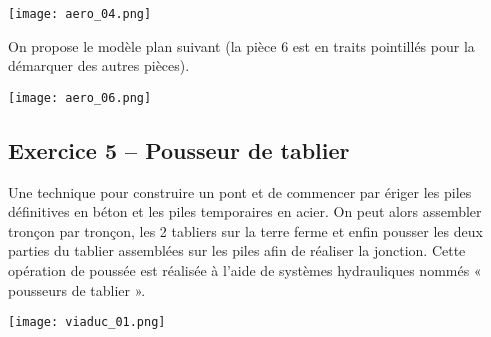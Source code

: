 \begin{marginfigure}
\texttt{[image: aero\_04.png]}
\end{marginfigure}

On propose le modèle plan suivant (la pièce 6 est en traits pointillés pour la démarquer des autres pièces).


\begin{center}
\texttt{[image: aero\_06.png]}
\end{center}

%
%
%
%


\subsection*{Exercice 5 -- Pousseur de tablier}




Une technique pour construire un pont et de commencer par ériger les piles définitives en béton et les piles
temporaires en acier. On peut alors assembler tronçon par tronçon, les 2 tabliers sur la terre ferme et enfin
pousser les deux parties du tablier assemblées sur les piles afin de réaliser la jonction.
Cette opération de poussée est réalisée à l’aide de systèmes hydrauliques nommés « pousseurs
de tablier ». 
\begin{marginfigure}
\centering
\texttt{[image: viaduc\_01.png]}
\end{marginfigure}

